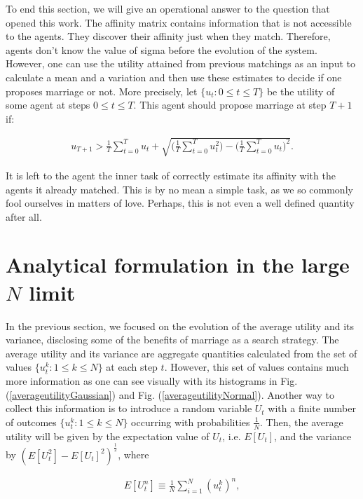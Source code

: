 \documentclass[12pt]{article}
\begin{document}

To end this section, we will give an operational answer to the question that opened this work. The affinity matrix contains information that is not accessible to the agents. They discover their affinity just when they match. Therefore, agents don't know the value of sigma before the evolution of the system. However, one can use the utility attained from previous matchings as an input to calculate a mean and a variation and then use these estimates to decide if one proposes marriage or not. More precisely, let $\{u_t:0\leq t\leq T\}$ be the utility of some agent at steps $0\leq t\leq T$. This agent should propose marriage at step $T+1$ if:

\begin{align}
    u_{T+1}>\frac{1}{T}\sum_{t=0}^Tu_t+\sqrt{\Big(\frac{1}{T}\sum_{t=0}^Tu_t^2\Big)-\Big(\frac{1}{T}\sum_{t=0}^Tu_t\Big)^2}.
\end{align}

\noindent It is left to the agent the inner task of correctly estimate its affinity with the agents it already matched. This is by no mean a simple task, as we so commonly fool ourselves in matters of love. Perhaps, this is not even a well defined quantity after all.


\section{Analytical formulation in the large \texorpdfstring{$N$}{N} limit}
\label{analytical} 

In the previous section, we focused on the evolution of the average utility and its variance, disclosing some of the benefits of marriage as a search strategy. The average utility and its variance are aggregate quantities calculated from the set of values $\{u_t^k:1\leq k\leq N\}$ at each step $t$. However, this set of values contains much more information as one can see visually with its histograms in Fig. (\ref{averageutilityGaussian}) and Fig. (\ref{averageutilityNormal}). Another way to collect this information is to introduce a random variable $U_t$ with a finite number of outcomes $\{u_t^k:1\leq k\leq N\}$ occurring with probabilities $\frac{1}{N}$. Then, the average utility will be given by the expectation value of $U_t$, i.e. $E[U_t]$, and the variance by $(E[U_t^2]-E[U_t]^2)^{\frac{1}{2}}$, where

\begin{align}
    E[U^n_t]\equiv\frac{1}{N}\sum_{i=1}^N(u_t^k)^n,
\end{align}
\end{document}
